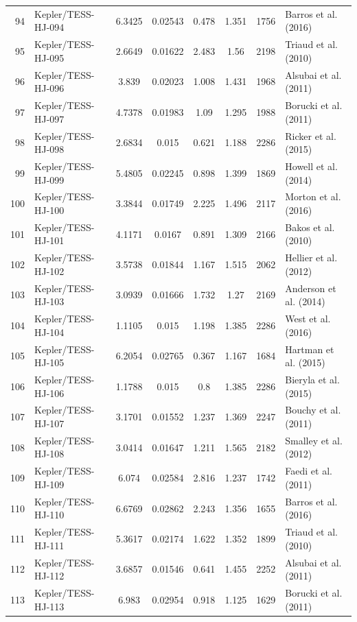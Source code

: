 \begin{longtable}{r l c c c c c p{4.2cm}}
94 & Kepler/TESS-HJ-094 & 6.3425 & 0.02543 & 0.478 & 1.351 & 1756 & Barros et al. (2016) \\
95 & Kepler/TESS-HJ-095 & 2.6649 & 0.01622 & 2.483 & 1.56 & 2198 & Triaud et al. (2010) \\
96 & Kepler/TESS-HJ-096 & 3.839 & 0.02023 & 1.008 & 1.431 & 1968 & Alsubai et al. (2011) \\
97 & Kepler/TESS-HJ-097 & 4.7378 & 0.01983 & 1.09 & 1.295 & 1988 & Borucki et al. (2011) \\
98 & Kepler/TESS-HJ-098 & 2.6834 & 0.015 & 0.621 & 1.188 & 2286 & Ricker et al. (2015) \\
99 & Kepler/TESS-HJ-099 & 5.4805 & 0.02245 & 0.898 & 1.399 & 1869 & Howell et al. (2014) \\
100 & Kepler/TESS-HJ-100 & 3.3844 & 0.01749 & 2.225 & 1.496 & 2117 & Morton et al. (2016) \\
101 & Kepler/TESS-HJ-101 & 4.1171 & 0.0167 & 0.891 & 1.309 & 2166 & Bakos et al. (2010) \\
102 & Kepler/TESS-HJ-102 & 3.5738 & 0.01844 & 1.167 & 1.515 & 2062 & Hellier et al. (2012) \\
103 & Kepler/TESS-HJ-103 & 3.0939 & 0.01666 & 1.732 & 1.27 & 2169 & Anderson et al. (2014) \\
104 & Kepler/TESS-HJ-104 & 1.1105 & 0.015 & 1.198 & 1.385 & 2286 & West et al. (2016) \\
105 & Kepler/TESS-HJ-105 & 6.2054 & 0.02765 & 0.367 & 1.167 & 1684 & Hartman et al. (2015) \\
106 & Kepler/TESS-HJ-106 & 1.1788 & 0.015 & 0.8 & 1.385 & 2286 & Bieryla et al. (2015) \\
107 & Kepler/TESS-HJ-107 & 3.1701 & 0.01552 & 1.237 & 1.369 & 2247 & Bouchy et al. (2011) \\
108 & Kepler/TESS-HJ-108 & 3.0414 & 0.01647 & 1.211 & 1.565 & 2182 & Smalley et al. (2012) \\
109 & Kepler/TESS-HJ-109 & 6.074 & 0.02584 & 2.816 & 1.237 & 1742 & Faedi et al. (2011) \\
110 & Kepler/TESS-HJ-110 & 6.6769 & 0.02862 & 2.243 & 1.356 & 1655 & Barros et al. (2016) \\
111 & Kepler/TESS-HJ-111 & 5.3617 & 0.02174 & 1.622 & 1.352 & 1899 & Triaud et al. (2010) \\
112 & Kepler/TESS-HJ-112 & 3.6857 & 0.01546 & 0.641 & 1.455 & 2252 & Alsubai et al. (2011) \\
113 & Kepler/TESS-HJ-113 & 6.983 & 0.02954 & 0.918 & 1.125 & 1629 & Borucki et al. (2011) \\

\end{longtable}
